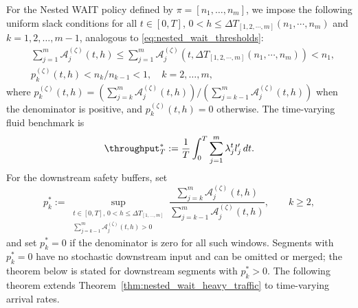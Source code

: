 For the Nested WAIT policy defined by $\pi = [n_1, \dots, n_m]$, we impose the following uniform slack conditions for all $t\in [0, T]$, $0<h\leq \Delta T_{[1,2,\cdots,m]}(n_1,\cdots,n_m)$ and $k = 1, 2, \dots, m-1$, analogous to \eqref{eq:nested_wait_thresholds}:
\begin{equation}
    \label{eq:nested_wait_thresholds_time_varying}
\begin{aligned}
        & \sum_{j=1}^m \mathcal A_j^{(\zeta)}(t,h)
        \leq
        \sum_{j=1}^m \mathcal A_j^{(\zeta)}\!\left(t,\Delta T_{[1,2,\cdots,m]}(n_1,\cdots,n_m)\right)< n_1, \\
        & p_k^{(\zeta)}(t,h) < n_k/n_{k-1} < 1,\quad k=2,\dots,m,
\end{aligned}
\end{equation}
where \(p_k^{(\zeta)}(t,h)=(\sum_{j=k}^m\mathcal A_j^{(\zeta)}(t,h))/(\sum_{j=k-1}^m\mathcal A_j^{(\zeta)}(t,h))\) when the denominator is positive, and \(p_k^{(\zeta)}(t,h)=0\) otherwise. The time-varying fluid benchmark is
\[
    \throughput_T^*
    :=
    \frac{1}{T}\int_0^T\sum_{j=1}^m\lambda_j^t l_j'\,dt .
\]
For the downstream safety buffers, set
\[
    p_k^*
    :=
    \sup_{\substack{t\in[0,T],\,0<h\le \Delta T_{[1,\dots,m]}\\
    \sum_{j=k-1}^m\mathcal A_j^{(\zeta)}(t,h)>0}}
    \frac{\sum_{j=k}^m\mathcal A_j^{(\zeta)}(t,h)}
    {\sum_{j=k-1}^m\mathcal A_j^{(\zeta)}(t,h)},\qquad k\ge2,
\]
and set \(p_k^*=0\) if the denominator is zero for all such windows.
Segments with \(p_k^*=0\) have no stochastic downstream input and can be omitted or merged; the theorem below is stated for downstream segments with \(p_k^*>0\).
The following theorem extends Theorem~\ref{thm:nested_wait_heavy_traffic} to time-varying arrival rates.

